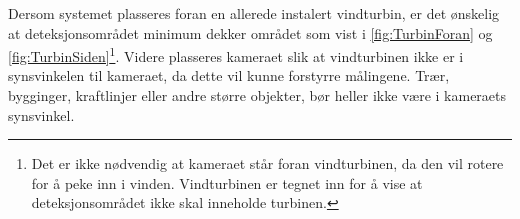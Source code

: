 Dersom systemet plasseres foran en allerede instalert vindturbin, er det ønskelig at deteksjonsområdet minimum dekker området som  vist i \autoref{fig:TurbinForan} og \ref{fig:TurbinSiden}\footnote{Det er ikke nødvendig at kameraet står foran vindturbinen, da den vil rotere for å peke inn i vinden. Vindturbinen er tegnet inn for å vise at deteksjonsområdet ikke skal inneholde turbinen.}.
Videre plasseres kameraet slik at vindturbinen ikke er i synsvinkelen til kameraet, da dette vil kunne forstyrre målingene. Trær, bygginger, kraftlinjer eller andre større objekter,  bør heller ikke være i kameraets synsvinkel. 


